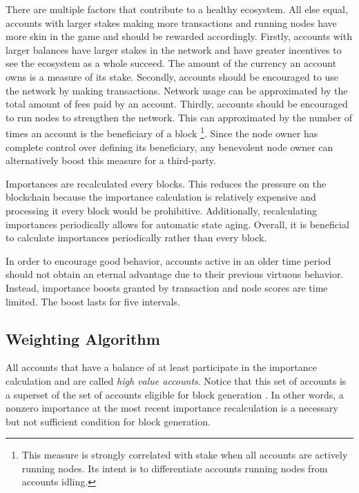 There are multiple factors that contribute to a healthy ecosystem.
All else equal, accounts with larger stakes making more transactions and running nodes have more skin in the game and should be rewarded accordingly.
Firstly, accounts with larger balances have larger stakes in the network and have greater incentives to see the ecosystem as a whole succeed.
The amount of the currency an account owns is a measure of its stake.
Secondly, accounts should be encouraged to use the network by making transactions.
Network usage can be approximated by the total amount of fees paid by an account.
Thirdly, accounts should be encouraged to run nodes to strengthen the network.
This can approximated by the number of times an account is the beneficiary of a block
\footnote{
	This measure is strongly correlated with stake when all accounts are actively running nodes.
	Its intent is to differentiate accounts running nodes from accounts idling.
}.
Since the node owner has complete control over defining its beneficiary, any benevolent node owner can alternatively boost this measure for a third-party.

Importances are recalculated every  blocks.
This reduces the pressure on the blockchain because the importance calculation is relatively expensive and processing it every block would be prohibitive.
Additionally, recalculating importances periodically allows for automatic state aging.
Overall, it is beneficial to calculate importances periodically rather than every block.

In order to encourage good behavior, accounts active in an older time period should not obtain an eternal advantage due to their previous virtuous behavior.
Instead, importance boosts granted by transaction and node scores are time limited.
The boost lasts for five  intervals.

\subsection{Weighting Algorithm}
\label{sec:consensus:weighting}

All accounts that have a balance of at least  participate in the importance calculation and are called \emph{high value accounts}.
Notice that this set of accounts is a superset of the set of accounts eligible for block generation .
In other words, a nonzero importance at the most recent importance recalculation is a necessary but not sufficient condition for block generation.

